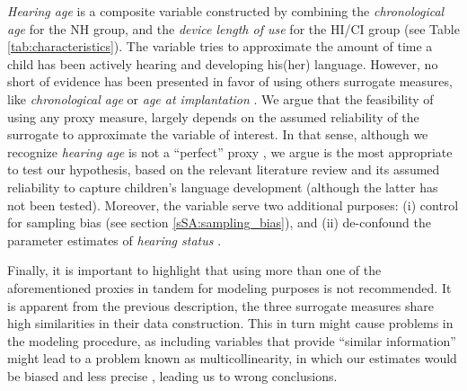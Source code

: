 \textit{Hearing age} is a composite variable constructed by combining the \textit{chronological age} for the NH group, and the \textit{device length of use} for the HI/CI group \citep{Faes_et_al_2021} (see Table \ref{tab:characteristics}). The variable tries to approximate the amount of time a child has been actively hearing and developing his(her) language. However, no short of evidence has been presented in favor of using others surrogate measures, like \textit{chronological age} \cite{Flipsen_et_al_2006, Habib_et_al_2010, Grandon_et_al_2020} or \textit{age at implantation} \cite{Niparko_et_al_2010, Boons_et_al_2012, Bruijnzeel_et_al_2016, Dettman_et_al_2016}. We argue that the feasibility of using any proxy measure, largely depends on the assumed reliability of the surrogate to approximate the variable of interest. In that sense, although we recognize \textit{hearing age} is not a ``perfect'' proxy \cite{Faes_et_al_2021}, we argue is the most appropriate to test our hypothesis, based on the relevant literature review and its assumed reliability to capture children's language development (although the latter has not been tested). Moreover, the variable serve two additional purposes: (i) control for sampling bias (see section \ref{sSA:sampling_bias}), and (ii) de-confound the parameter estimates of \textit{hearing status} \cite{Cinelli_et_al_2021}.

Finally, it is important to highlight that using more than one of the aforementioned proxies in tandem for modeling purposes is not recommended. It is apparent from the previous description, the three surrogate measures share high similarities in their data construction. This in turn might cause problems in the modeling procedure, as including variables that provide ``similar information'' might lead to a problem known as multicollinearity, in which our estimates would be biased and less precise \cite{Farrar_et_al_1967}, leading us to wrong conclusions.
%
\begin{comment}
	for the NH group uses the child's \textit{age} (at recording), the method cannot use the same variable for the other two groups. This is due to the fact that \textit{age} is merely used as a proxy, for the amount of time a child has been developing his(her) language. In that sense, more appropriate variables to use under the HI/CI group would be e.g. the \textit{device length of use}, which approximates the ``hearing age'' of such children, or their \textit{vocabulary size}, which resembles their "lexical age" \citep{Faes_et_al_2021}. For this research, we consider the \textit{device length of use} as the simplest one to implement.
\end{comment}

